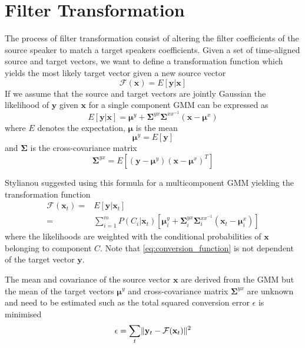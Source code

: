 \section{Filter Transformation} %
\label{sec:conversion_function}
The process of filter transformation consist of altering the filter coefficients of the source speaker to match a target speakers coefficients. Given a set of time-aligned source and target vectors, we want to define a transformation function which yields the most likely target vector given a new source vector
\begin{equation}
	\mathcal{F}(\mathbf{x}) = E[\mathbf{y}\vert \mathbf{x}]
\end{equation}
If we assume that the source and target vectors are jointly Gaussian the likelihood of $\mathbf{y}$ given $\mathbf{x}$ for a single component GMM can be expressed as \cite{kay93}
\begin{equation}
	E[\mathbf{y}\vert \mathbf{x}] = \boldsymbol{\mu}^y + \mathbf{\Sigma}^{yx} \mathbf{\Sigma}^{xx^{-1}} (\mathbf{x}-\boldsymbol{\mu}^x)
\end{equation}
where $E$ denotes the expectation, $\boldsymbol{\mu}$ is the mean
\begin{equation}
	\boldsymbol{\mu}^y = E[\mathbf{y}]
\end{equation}
and $\mathbf{\Sigma}$ is the cross-covariance matrix
\begin{equation}
	\mathbf{\Sigma}^{yx} = E[(\mathbf{y}-\boldsymbol{\mu}^y)(\mathbf{x}-\boldsymbol{\mu}^x)^T]
\end{equation}

Stylianou \etal \cite{stylianou95} suggested using this formula for a multicomponent GMM yielding the transformation function
\begin{equation}
	\label{eq:conversion_function}
	\begin{split}
		\mathcal{F}(\mathbf{x}_t) =& E[\mathbf{y}\vert \mathbf{x}_t]\\
		=& \sum_{i=1}^{m}P(C_i \vert \mathbf{x}_t)[\boldsymbol{\mu}_i^y + \mathbf{\Sigma}_i^{yx} \mathbf{\Sigma}_i^{xx^{-1}} (\mathbf{x}_t-\boldsymbol{\mu}_i^x)]
	\end{split}
\end{equation}
where the likelihoods are weighted with the conditional probabilities of $\mathbf{x}$ belonging to component $C$. Note that \eqref{eq:conversion_function} is not dependent of the target vector $\mathbf{y}$.

The mean and covariance of the source vector $\mathbf{x}$ are derived from the GMM but the mean of the target vectors $\boldsymbol{\mu}^y$ and cross-covariance matrix $\mathbf{\Sigma}^{yx}$ are unknown and need to be estimated such as the total squared conversion error $\epsilon$ is minimised
\begin{equation}
	\label{eq:conversion_error}
	\epsilon = \sum_{t} \lVert\mathbf{y}_t - \mathcal{F}(\mathbf{x}_t)\rVert^2
\end{equation}

